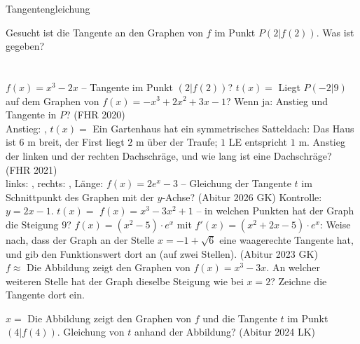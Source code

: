 \setcounter{aufgabe}{8}

\begin{aufgabe}{Tangentengleichung}
\begin{teile}
\teil Gesucht ist die Tangente an den Graphen von $f$ im Punkt $P(2 | f(2))$. Was ist gegeben? \\  \\  \\ 
\teil $f(x) = x^3 - 2x$ – Tangente im Punkt $(2 | f(2))$? $t(x) =$ \leerfeld
\teil Liegt $P(-2 | 9)$ auf dem Graphen von $f(x) = -x^3 + 2x^2 + 3x - 1$? Wenn ja: Anstieg und Tangente in $P$? \hfill (FHR 2020) \\ Anstieg: \leerfeld , $t(x) =$ \leerfeld
\teil Ein Gartenhaus hat ein symmetrisches Satteldach: Das Haus ist $6$ m breit, der First liegt $2$ m über der Traufe; $1$ LE entspricht $1$ m. Anstieg der linken und der rechten Dachschräge, und wie lang ist eine Dachschräge? \hfill (FHR 2021) \\ links: \leerfeld , rechts: \leerfeld , Länge: \leerfeld[m]
\teil $f(x) = 2e^x - 3$ – Gleichung der Tangente $t$ im Schnittpunkt des Graphen mit der $y$-Achse? \hfill (Abitur 2026 GK) Kontrolle: $y = 2x - 1$. $t(x) =$ \leerfeld
\teil $f(x) = x^3 - 3x^2 + 1$ – in welchen Punkten hat der Graph die Steigung $9$? \leerfeld
\teil $f(x) = (x^2 - 5) \cdot e^x$ mit $f'(x) = (x^2 + 2x - 5) \cdot e^x$: Weise nach, dass der Graph an der Stelle $x = -1 + \sqrt{6}$ eine waagerechte Tangente hat, und gib den Funktionswert dort an (auf zwei Stellen). \hfill (Abitur 2023 GK) \\ $f \approx$ \leerfeld
\teil Die Abbildung zeigt den Graphen von $f(x) = x^3 - 3x$. An welcher weiteren Stelle hat der Graph dieselbe Steigung wie bei $x = 2$? Zeichne die Tangente dort ein.

\begin{ksys}[xmin=-3,xmax=3,ymin=-5,ymax=5]  \end{ksys}
$x =$ \leerfeld
\teil Die Abbildung zeigt den Graphen von $f$ und die Tangente $t$ im Punkt $(4 | f(4))$. Gleichung von $t$ anhand der Abbildung? \hfill (Abitur 2024 LK) \\


\end{teile}
\end{aufgabe}
